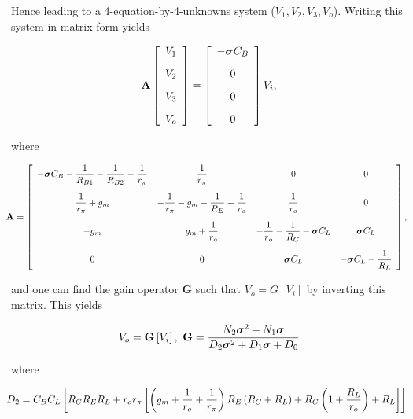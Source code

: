 	Hence leading to a 4-equation-by-4-unknowns system ($V_1,V_2,V_3,V_o$). Writing this system in matrix form yields

\begin{equation} \mathbf{A}\left[\begin{array}{c} V_1 \\[3mm] V_2 \\[3mm] V_3 \\[3mm] V_o \end{array}\right] = \left[\begin{array}{c} -\boldsymbol{\sigma} C_B \\[3mm] 0 \\[3mm] 0 \\[3mm] 0 \end{array}\right]V_i, \end{equation}

	\noindent where

\begin{equation}
\hspace{-2mm}\mathbf{A} = \left[\begin{array}{cccc}
	 - \dpo C_B - \dfrac{1}{R_{B1}} - \dfrac{1}{R_{B2}} - \dfrac{1}{r_\pi} & \dfrac{1}{r_\pi} & 0 & 0  \\[5mm]
	\dfrac{1}{r_\pi} + g_m & -\dfrac{1}{r_\pi} - g_m - \dfrac{1}{R_E} - \dfrac{1}{r_o} & \dfrac{1}{r_o} & 0 \\[5mm]
	-g_m & g_m + \dfrac{1}{r_o} & - \dfrac{1}{r_o} - \dfrac{1}{R_C} - \dpo C_L & \dpo C_L \\[5mm]
	0 & 0 & \dpo C_L & -\dpo C_L - \dfrac{1}{R_L}
\end{array}\right],
\end{equation}

	\noindent and one can find the gain operator $\mathbf{G}$ such that $V_o = G\left[V_i\right]$ by inverting this matrix. This yields

\begin{equation} V_o = \mathbf{G}\left[V_i\right],\ \mathbf{G} = \dfrac{ N_2\ndpo{2} + N_1\dpo}{D_2\ndpo{2} + D_1\dpo + D_0} \end{equation}

	\noindent where

\begin{equation}\hspace{-2mm} D_2 =  C_BC_L\left[R_{C}R_ER_L +  r_o r_{\pi} \left[\left(g_m  + \dfrac{1}{r_o} +  \dfrac{1}{r_{\pi}}\right)R_E\left(R_C + R_L\right) + R_C\left(1 + \dfrac{R_L}{r_o}\right) + R_L\right]\right]  \end{equation}

